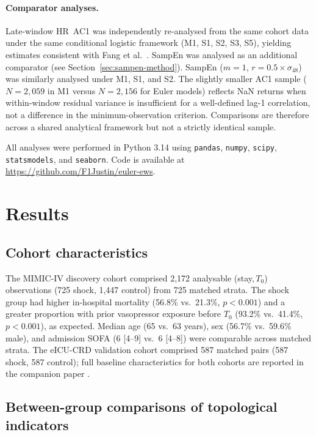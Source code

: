 \documentclass[12pt,a4paper]{article}
\begin{document}
\paragraph{Comparator analyses.}
Late-window HR~AC1 was independently re-analysed from the same cohort
data under the same conditional logistic framework (M1, S1, S2, S3, S5),
yielding estimates consistent with Fang et al.\ \cite{fang2026}.
SampEn was analysed as an additional comparator (see Section~\ref{sec:sampen-method}).
SampEn ($m=1$, $r=0.5 \times \sigma_{48}$) was similarly analysed
under M1, S1, and S2.
The slightly smaller AC1 sample ($N=2{,}059$ in M1 versus
$N=2{,}156$ for Euler models) reflects NaN returns when within-window
residual variance is insufficient for a well-defined lag-1 correlation,
not a difference in the minimum-observation criterion.
Comparisons are therefore across a shared analytical framework but
not a strictly identical sample.

All analyses were performed in Python 3.14 using \texttt{pandas},
\texttt{numpy}, \texttt{scipy}, \texttt{statsmodels}, and \texttt{seaborn}.
Code is available at \url{https://github.com/F1Justin/euler-ews}.

\section{Results}
\label{sec:results}

\subsection{Cohort characteristics}
The MIMIC-IV discovery cohort comprised 2,172 analysable (stay,\,$T_0$)
observations (725 shock, 1,447 control) from 725 matched strata.
The shock group had higher in-hospital mortality (56.8\% vs.\ 21.3\%,
$p<0.001$) and a greater proportion with prior vasopressor exposure
before $T_0$ (93.2\% vs.\ 41.4\%, $p<0.001$), as expected.
Median age (65 vs.\ 63 years), sex (56.7\% vs.\ 59.6\% male), and
admission SOFA (6 [4--9] vs.\ 6 [4--8]) were comparable across matched
strata.
The eICU-CRD validation cohort comprised 587 matched pairs (587 shock,
587 control); full baseline characteristics for both cohorts are reported
in the companion paper \cite{fang2026}.

\subsection{Between-group comparisons of topological indicators}
\label{sec:res-gee}
\end{document}
